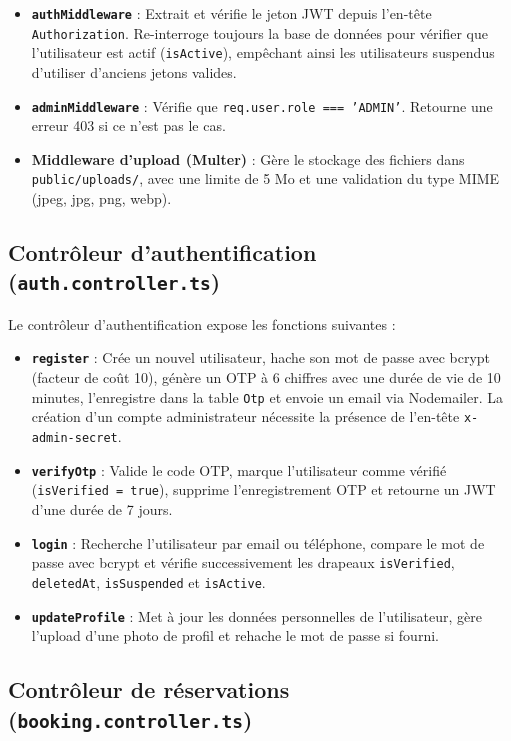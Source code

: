 \begin{itemize}
    \item \textbf{\texttt{authMiddleware}} : Extrait et vérifie le jeton JWT depuis l'en-tête \texttt{Authorization}. Re-interroge toujours la base de données pour vérifier que l'utilisateur est actif (\texttt{isActive}), empêchant ainsi les utilisateurs suspendus d'utiliser d'anciens jetons valides.
    \item \textbf{\texttt{adminMiddleware}} : Vérifie que \texttt{req.user.role === 'ADMIN'}. Retourne une erreur 403 si ce n'est pas le cas.
    \item \textbf{Middleware d'upload (Multer)} : Gère le stockage des fichiers dans \texttt{public/uploads/}, avec une limite de 5 Mo et une validation du type MIME (jpeg, jpg, png, webp).
\end{itemize}

\subsection{Contrôleur d'authentification (\texttt{auth.controller.ts})}

Le contrôleur d'authentification expose les fonctions suivantes :

\begin{itemize}
    \item \textbf{\texttt{register}} : Crée un nouvel utilisateur, hache son mot de passe avec bcrypt (facteur de coût 10), génère un OTP à 6 chiffres avec une durée de vie de 10 minutes, l'enregistre dans la table \texttt{Otp} et envoie un email via Nodemailer. La création d'un compte administrateur nécessite la présence de l'en-tête \texttt{x-admin-secret}.
    \item \textbf{\texttt{verifyOtp}} : Valide le code OTP, marque l'utilisateur comme vérifié (\texttt{isVerified = true}), supprime l'enregistrement OTP et retourne un JWT d'une durée de 7 jours.
    \item \textbf{\texttt{login}} : Recherche l'utilisateur par email ou téléphone, compare le mot de passe avec bcrypt et vérifie successivement les drapeaux \texttt{isVerified}, \texttt{deletedAt}, \texttt{isSuspended} et \texttt{isActive}.
    \item \textbf{\texttt{updateProfile}} : Met à jour les données personnelles de l'utilisateur, gère l'upload d'une photo de profil et rehache le mot de passe si fourni.
\end{itemize}

\subsection{Contrôleur de réservations (\texttt{booking.controller.ts})}

